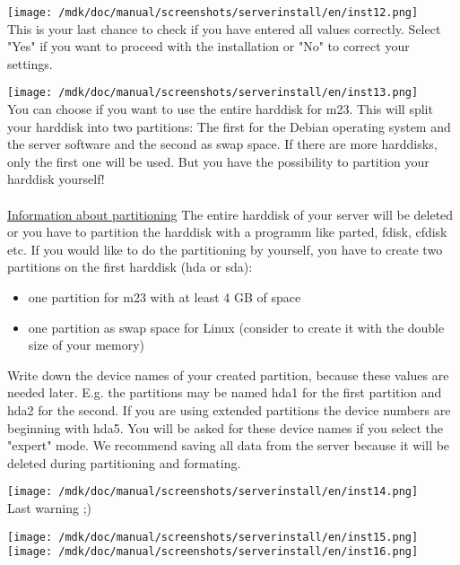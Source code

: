 \texttt{[image: /mdk/doc/manual/screenshots/serverinstall/en/inst12.png]}
\\
This is your last chance to check if you have entered all values correctly. Select "Yes" if you want to proceed with the installation or "No" to correct your settings.



\texttt{[image: /mdk/doc/manual/screenshots/serverinstall/en/inst13.png]}
\\
You can choose if you want to use the entire harddisk for m23. This will split your harddisk into two partitions: The first for the Debian operating system and the server software and the second as swap space. If there are more harddisks, only the first one will be used. But you have the possibility to partition your harddisk yourself!\\\\
\underline{Information about partitioning}
The entire harddisk of your server will be deleted or you have to partition the harddisk with a programm like parted, fdisk, cfdisk etc. If you would like to do the partitioning by yourself, you have to create two partitions on the first harddisk (hda or sda):
\begin{itemize}
\item one partition for m23 with at least 4 GB of space
\item one partition as swap space for Linux (consider to create it with the double size of your memory)
\end{itemize}
Write down the device names of your created partition, because these values are needed later. E.g. the partitions may be named hda1 for the first partition and hda2 for the second. If you are using extended partitions the device numbers are beginning with hda5. You will be asked for these device names if you select the "expert" mode. We recommend saving all data from the server because it will be deleted during partitioning and formating.



\texttt{[image: /mdk/doc/manual/screenshots/serverinstall/en/inst14.png]}
\\
Last warning ;)



\texttt{[image: /mdk/doc/manual/screenshots/serverinstall/en/inst15.png]}
\\



\texttt{[image: /mdk/doc/manual/screenshots/serverinstall/en/inst16.png]}
\\



